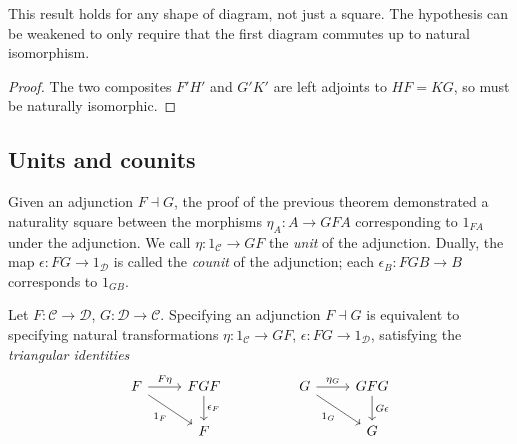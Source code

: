 This result holds for any shape of diagram, not just a square.
The hypothesis can be weakened to only require that the first diagram commutes up to natural isomorphism.
\begin{proof}
    The two composites \( F'H' \) and \( G'K' \) are left adjoints to \( HF = KG \), so must be naturally isomorphic.
\end{proof}

\subsection{Units and counits}
Given an adjunction \( F \dashv G \), the proof of the previous theorem demonstrated a naturality square between the morphisms \( \eta_A : A \to GFA \) corresponding to \( 1_{FA} \) under the adjunction.
We call \( \eta : 1_{\mathcal C} \to GF \) the \emph{unit} of the adjunction.
Dually, the map \( \epsilon : FG \to 1_{\mathcal D} \) is called the \emph{counit} of the adjunction; each \( \epsilon_B : FGB \to B \) corresponds to \( 1_{GB} \).
\begin{theorem}
    Let \( F : \mathcal C \to \mathcal D \), \( G : \mathcal D \to \mathcal C \).
    Specifying an adjunction \( F \dashv G \) is equivalent to specifying natural transformations \( \eta : 1_{\mathcal C} \to GF \), \( \epsilon : FG \to 1_{\mathcal D} \), satisfying the \emph{triangular identities}
\[\begin{tikzcd}
	F & FGF && G & GFG \\
	& F &&& G
	\arrow["F\eta", from=1-1, to=1-2]
	\arrow["{\epsilon_F}", from=1-2, to=2-2]
	\arrow["{1_F}"', from=1-1, to=2-2]
	\arrow["{\eta_G}", from=1-4, to=1-5]
	\arrow["G\epsilon", from=1-5, to=2-5]
	\arrow["{1_G}"', from=1-4, to=2-5]
\end{tikzcd}\]
\end{theorem}
